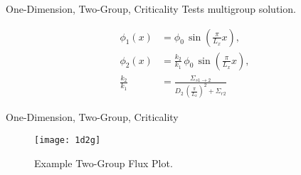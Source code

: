 \begin{frame}{One-Dimension, Two-Group, Criticality}
  Tests multigroup solution.
  \begin{table}
    \label{tab:1d2g}
    \begin{center}
    \end{center}
  \end{table}
  \begin{align}
    \phi_1(x) &= \phi_0 \, \sin\left(\frac{\pi}{L_x} x \right), \\
    \phi_2(x) &= \frac{k_2}{k_1} \, \phi_0 \, \sin\left(\frac{\pi}{L_x} x
      \right), \\
    \frac{k_2}{k_1} &= \frac{\Sigma_{s 1\rightarrow 2}}{D_2 \,
      \left(\frac{\pi}{L_x}\right)^2 + \Sigma_{r2}}
  \end{align}
\end{frame}

\begin{frame}{One-Dimension, Two-Group, Criticality}
  \begin{figure}
    \centering
    \texttt{[image: 1d2g]}
    \caption{Example Two-Group Flux Plot.}
    \label{fig:1d2g}
  \end{figure}
\end{frame}

